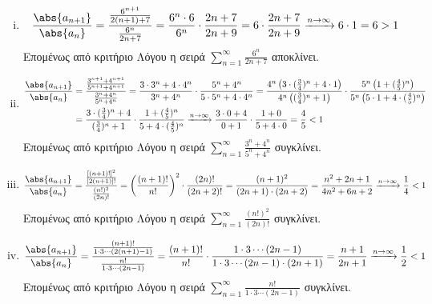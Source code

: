 \begin{enumerate}
\begin{enumerate}[i)]
        \item 
            \[
                \frac{\abs{a_{n+1}}}{\abs{a_{n}}} = \frac{\frac{6^{n+1}}{2(n+1)+7}}
                {\frac{6^{n}}{2n+7}} = \frac{6^{n}\cdot 6}{6^{n}} \cdot 
                \frac{2n+7}{2n+9} = 6 \cdot \frac{2n+7}{2n+9} 
                \xrightarrow{n \to \infty} 6 \cdot 1 = 6>1
            \] 
            Επομένως από κριτήριο Λόγου η σειρά 
            $ \sum_{n=1}^{\infty} \frac{6^{n}}{2n+7} $ αποκλίνει.

        \item 
            \begin{align*}
                \frac{\abs{a_{n+1}}}{\abs{a_{n}}}
                &=\frac{\frac{3^{n+1}+4^{n+1}}{5^{n+1}
                +4^{n+1}}}{\frac{3^{n}+4^{n}}{5^{n}+4^{n}}} = 
                \frac{3 \cdot 3^{n}+ 4\cdot 4^{n}}{3^{n}+4^{n}} \cdot 
                \frac{5^{n}+4^{n}}{5\cdot 5^{n}+ 4 \cdot 4^{n}} = \frac{4^{n}
                    \left(3\cdot (\frac{3}{4})^{n}+4 
                \cdot 1\right)}{4^{n}\left((\frac{3}{4} )^{n}+ 1\right)} \cdot 
                \frac{5^{n}\left(1+ (\frac{4}{5})^{n}\right)}{5^{n}\left(5\cdot 1 + 4
                \cdot(\frac{4}{5} )^{n}\right)} \\ 
                &= \frac{3\cdot (\frac{3}{4})^{n}+4}{(\frac{3}{4} )^{n}+ 1} \cdot 
                \frac{1+ (\frac{4}{5})^{n}}{5 + 4 \cdot(\frac{4}{5} )^{n}} 
                \xrightarrow{n \to \infty} \frac{3 \cdot 0 + 4}{0 + 1 } \cdot 
                \frac{1 + 0}{5 + 4 \cdot 0} = \frac{4}{5} <1
            \end{align*} 
            Επομένως από κριτήριο Λόγου η σειρά $ \sum_{n=1}^{\infty}
            \frac{3^{n}+4^{n}}{5^{n}+4^{n}} $ συγκλίνει.

        \item 
            \[
                \frac{\abs{a_{n+1}}}{\abs{a_{n}}} =
                \frac{\frac{[(n+1)!]^{2}}{[2(n+1)]!}}{\frac{(n!)^{2}}{(2n)!}} = 
                \left(\frac{(n+1)!}{n!}\right)^{2} \cdot \frac{(2n)!}{(2n+2)!} = 
                \frac{(n+1)^{2} }{(2n+1)\cdot (2n+2)} = 
                \frac{n^{2}+2n+1}{4n^{2}+6n+2} \xrightarrow{n \to \infty} 
                \frac{1}{4} <1
            \] 
            Επομένως από κριτήριο Λόγου η σειρά $ \sum_{n=1}^{\infty} \frac{(n!)^{2}}
            {(2n)!} $ συγκλίνει.

        \item 
            \[
                \frac{\abs{a_{n+1}}}{\abs{a_{n}}} = \frac{\frac{(n+1)!}{1\cdot 3 \cdots
                (2(n+1)-1)}}{\frac{n!}{1\cdot 3 \cdots (2n-1)}} = 
                \frac{(n+1)!}{n!} \cdot \frac{1\cdot 3 \cdots (2n-1)}{1\cdot 3 \cdots 
                (2n-1)\cdot (2n+1)} = \frac{n+1}{2n+1} \xrightarrow{n \to \infty} 
                \frac{1}{2} <1 
            \] 
            Επομένως από κριτήριο Λόγου η σειρά $ \sum_{n=1}^{\infty} 
            \frac{n!}{1\cdot 3 \cdots (2n-1)}  $ συγκλίνει.
    \end{enumerate}


\end{enumerate}
